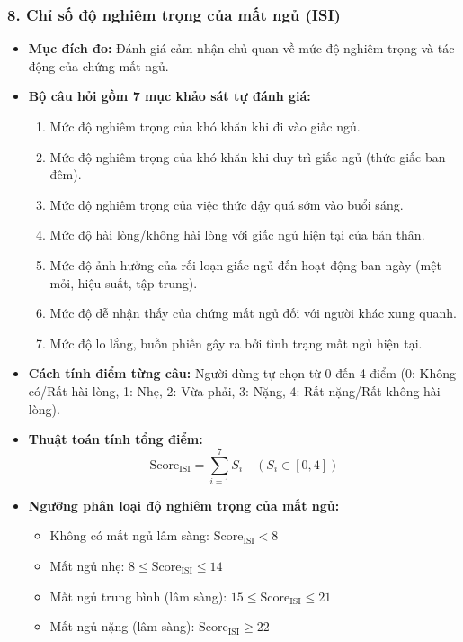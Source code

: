 \documentclass[12pt,a4paper]{article}
\begin{document}
\subsubsection*{8. Chỉ số độ nghiêm trọng của mất ngủ (ISI)}
\begin{itemize}
    \item \textbf{Mục đích đo:} Đánh giá cảm nhận chủ quan về mức độ nghiêm trọng và tác động của chứng mất ngủ.
    \item \textbf{Bộ câu hỏi gồm 7 mục khảo sát tự đánh giá:}
    \begin{enumerate}
        \item Mức độ nghiêm trọng của khó khăn khi đi vào giấc ngủ.
        \item Mức độ nghiêm trọng của khó khăn khi duy trì giấc ngủ (thức giấc ban đêm).
        \item Mức độ nghiêm trọng của việc thức dậy quá sớm vào buổi sáng.
        \item Mức độ hài lòng/không hài lòng với giấc ngủ hiện tại của bản thân.
        \item Mức độ ảnh hưởng của rối loạn giấc ngủ đến hoạt động ban ngày (mệt mỏi, hiệu suất, tập trung).
        \item Mức độ dễ nhận thấy của chứng mất ngủ đối với người khác xung quanh.
        \item Mức độ lo lắng, buồn phiền gây ra bởi tình trạng mất ngủ hiện tại.
    \end{enumerate}
    \item \textbf{Cách tính điểm từng câu:} Người dùng tự chọn từ 0 đến 4 điểm (0: Không có/Rất hài lòng, 1: Nhẹ, 2: Vừa phải, 3: Nặng, 4: Rất nặng/Rất không hài lòng).
    \item \textbf{Thuật toán tính tổng điểm:}
    \begin{equation}
        \text{Score}_{\text{ISI}} = \sum_{i=1}^{7} S_i \quad (S_i \in [0, 4])
    \end{equation}
    \item \textbf{Ngưỡng phân loại độ nghiêm trọng của mất ngủ:}
    \begin{itemize}
        \item Không có mất ngủ lâm sàng: $\text{Score}_{\text{ISI}} < 8$
        \item Mất ngủ nhẹ: $8 \le \text{Score}_{\text{ISI}} \le 14$
        \item Mất ngủ trung bình (lâm sàng): $15 \le \text{Score}_{\text{ISI}} \le 21$
        \item Mất ngủ nặng (lâm sàng): $\text{Score}_{\text{ISI}} \ge 22$
    \end{itemize}
\end{itemize}
\end{document}
